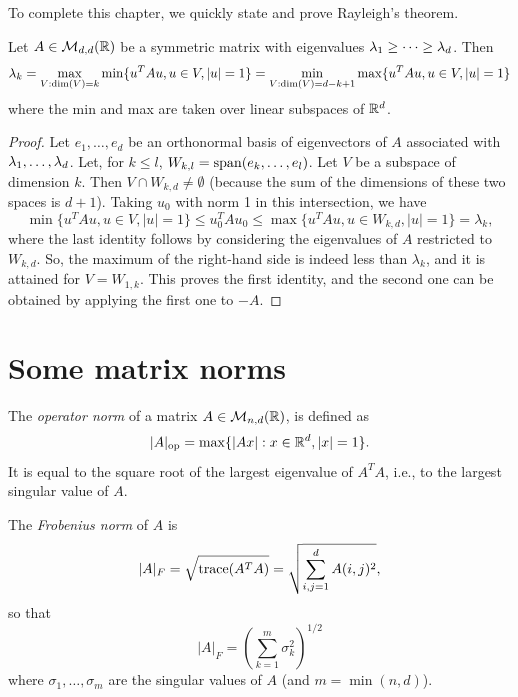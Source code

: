 To complete this chapter, we quickly state and prove Rayleigh's theorem.
\begin{theorem}
\label{th:rayleigh.base}
Let $A\in {\mathcal M}_{d,d}({\mathbb{R}})$ be a symmetric matrix with eigenvalues $\lambda_1 \geq \cdots \geq \lambda_d$. Then 
\[
\lambda_k = \max_{V: \dim(V) = k}\min\{u^TAu, u\in V, |u|=1\} = \min_{V: \dim(V) = d-k+1}\max\{u^TAu, u\in V, |u|=1\}
\]
where the min and max are taken over linear subspaces of ${\mathbb{R}}^d$.
\end{theorem}
\begin{proof}
Let $e_1, \ldots, e_d$ be an orthonormal basis of eigenvectors of $A$ associated with $\lambda_1, \ldots, \lambda_d$. Let, for $k\leq l$,  $W_{k,l} = \mathrm{span}(e_k, \ldots, e_l)$. Let $V$ be  a subspace of dimension $k$. Then $V\cap W_{k,d} \neq \emptyset$ (because the sum of the dimensions of these two spaces is $d+1$). Taking $u_0$ with norm 1 in this intersection, we have  
\[
\min\{u^TAu, u\in V, |u|=1\} \leq u_0^TAu_0 \leq \max\{u^TAu, u\in W_{k,d}, |u|=1\} = \lambda_k,
\]
where the last identity follows by considering the eigenvalues of $A$ restricted to $W_{k,d}$.  So, the maximum of the right-hand side is indeed less than $\lambda_k$, and it is attained for $V = W_{1,k}$. This proves the first identity, and the second one can be obtained by applying the first one to $-A$.
\end{proof}

\section{Some matrix norms}
\label{sec:matrix.norms}

The {\em operator norm} of a matrix $A \in {\mathcal M}_{n,d}({\mathbb{R}})$, is defined as
\[
|A|_{\mathrm{op}} = \max \{|Ax|: x\in {\mathbb{R}}^d, |x| = 1\}.
\]
It is equal to the square root of the largest eigenvalue of $A^TA$, i.e., to the largest singular value of $A$.

The {\em Frobenius norm } of $A$ is 
\[
|A|_F = \sqrt{{\mathrm{trace}}(A^TA)} = \sqrt{\sum_{i,j=1}^d A(i,j)^2},
\]
so that
\[
|A|_F = \left(\sum_{k=1}^m \sigma_k^2\right)^{1/2}
\]
where $\sigma_1, \ldots, \sigma_m $ are the singular values of $A$ (and $m  = \min(n,d)$). 

